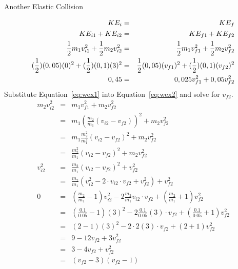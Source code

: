 \begin{wex}{Another Elastic Collision}
{\begin{eqnarray}
KE_{i}&=&KE_{f}\nonumber\\
KE_{i1}+KE_{i2}&=&KE_{f1}+KE_{f2}\nonumber \\
\frac{1}{2}m_{1}v_{i1}^2 + \frac{1}{2}m_{2}{v}_{i2}^2 &=& \frac{1}{2}m_{1}{v}_{f1}^2+\frac{1}{2}m_{2}{v}_{f2}^2\nonumber\\
(\frac{1}{2})(0,05)(0)^2+(\frac{1}{2})(0,1)(3)^2&=&
\frac{1}{2}(0,05)(v_{f1})^2+(\frac{1}{2})(0,1)(v_{f2})^2\nonumber\\
0,45&=&0,025v_{f1}^2+0,05v_{f2}^2
\label{eq:wex2}
\end{eqnarray}
Substitute Equation~\ref{eq:wex1} into Equation~\ref{eq:wex2} and solve for $v_{f2}$.
\begin{eqnarray*}
m_{2}{v}_{i2}^2 &=& m_{1}{v}_{f1}^2+m_{2}{v}_{f2}^2\\
&=& m_{1} \left( \frac{m_2}{m_1}({v}_{i2} - {v}_{f2}) \right) ^2 +m_{2}{v}_{f2}^2\\
&=& m_{1} \frac{m_2^2}{m_1^2}\left({v}_{i2} - {v}_{f2} \right) ^2 +m_{2}{v}_{f2}^2\\
&=& \frac{m_2^2}{m_1}\left({v}_{i2} - {v}_{f2} \right) ^2 +m_{2}{v}_{f2}^2\\
{v}_{i2}^2&=& \frac{m_2}{m_1}\left({v}_{i2} - {v}_{f2} \right) ^2 +{v}_{f2}^2\\
&=&\frac{m_2}{m_1}\left({v}_{i2}^2 - 2\cdot v_{i2}\cdot v_{f2} + {v}_{f2}^2 \right) +{v}_{f2}^2\\
0&=&\left(\frac{m_2}{m_1}-1 \right){v}_{i2}^2 - 2 \frac{m_2}{m_1} v_{i2}\cdot v_{f2} + \left(\frac{m_2}{m_1}+1\right){v}_{f2}^2\\
&=&\left(\frac{0.1}{0.05}-1 \right)(3)^2 - 2 \frac{0.1}{0.05} (3)\cdot v_{f2} + \left(\frac{0.1}{0.05}+1\right){v}_{f2}^2\\
&=&(2-1)(3)^2 - 2 \cdot 2 (3)\cdot v_{f2} + (2+1){v}_{f2}^2\\
&=&9 - 12v_{f2} + 3{v}_{f2}^2\\
&=&3 - 4v_{f2} + {v}_{f2}^2\\
&=&(v_{f2}-3)(v_{f2}-1)
\end{eqnarray*}

}
\end{wex}
